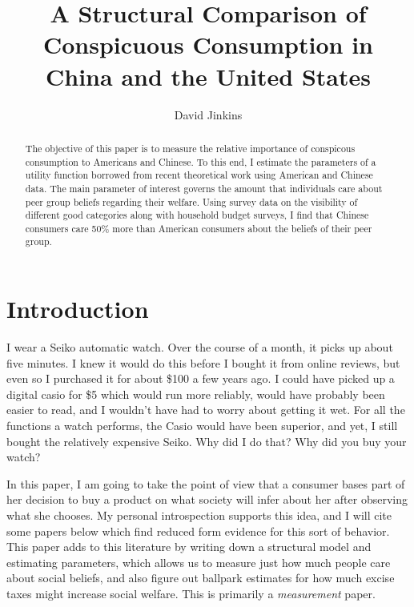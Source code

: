 \documentclass{article}
\title{A Structural Comparison of Conspicuous Consumption in China and the United States
}
\author{David Jinkins}
\begin{document}
\maketitle

\begin{abstract}
    The objective of this paper is to measure the relative importance of conspicous consumption to Americans and Chinese.  To this end, I estimate the parameters of a utility function borrowed from recent theoretical work using American and Chinese data.  The main parameter of interest governs the amount that individuals care about peer group beliefs regarding their welfare.  Using survey data on the visibility of different good categories along with household budget surveys, I find that Chinese consumers care 50\% more than American consumers about the beliefs of their peer group.  
\end{abstract}

\section{Introduction}

I wear a Seiko automatic watch.  Over the course of a month, it picks up about five minutes.  I knew it would do this before I bought it from online reviews, but even so I purchased it for about \$100 a few years ago.  I could have picked up a digital casio for \$5 which would run more reliably, would have probably been easier to read, and I wouldn't have had to worry about getting it wet.  For all the functions a watch performs, the Casio would have been superior, and yet, I still bought the relatively expensive Seiko.  Why did I do that?  Why did you buy your watch?

In this paper, I am going to take the point of view that a consumer bases part of her decision to buy a product on what society will infer about her after observing what she chooses.  
My personal introspection supports this idea, and I will cite some papers below which find reduced form evidence for this sort of behavior. This paper adds to this literature by writing down a structural model and estimating parameters, which allows us to measure just how much people care about social beliefs, and also figure out ballpark estimates for how much excise taxes might increase social welfare. This is primarily a \emph{measurement} paper.
\end{document}
